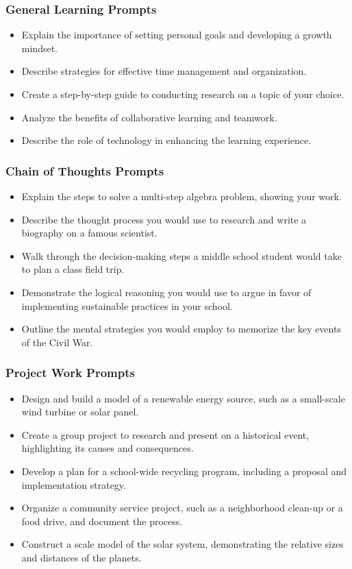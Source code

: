 \begin{frame}[fragile]\frametitle{General Learning Prompts}
    \begin{itemize}
        \item Explain the importance of setting personal goals and developing a growth mindset.
        \item Describe strategies for effective time management and organization.
        \item Create a step-by-step guide to conducting research on a topic of your choice.
        \item Analyze the benefits of collaborative learning and teamwork.
        \item Describe the role of technology in enhancing the learning experience.
    \end{itemize}
\end{frame}


\begin{frame}[fragile]\frametitle{Chain of Thoughts Prompts}
    \begin{itemize}
        \item Explain the steps to solve a multi-step algebra problem, showing your work.
        \item Describe the thought process you would use to research and write a biography on a famous scientist.
        \item Walk through the decision-making steps a middle school student would take to plan a class field trip.
        \item Demonstrate the logical reasoning you would use to argue in favor of implementing sustainable practices in your school.
        \item Outline the mental strategies you would employ to memorize the key events of the Civil War.
    \end{itemize}
\end{frame}

\begin{frame}[fragile]\frametitle{Project Work Prompts}
    \begin{itemize}
        \item Design and build a model of a renewable energy source, such as a small-scale wind turbine or solar panel.
        \item Create a group project to research and present on a historical event, highlighting its causes and consequences.
        \item Develop a plan for a school-wide recycling program, including a proposal and implementation strategy.
        \item Organize a community service project, such as a neighborhood clean-up or a food drive, and document the process.
        \item Construct a scale model of the solar system, demonstrating the relative sizes and distances of the planets.
    \end{itemize}
\end{frame}

